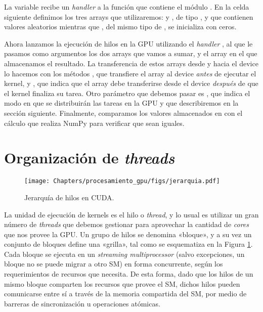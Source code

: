 La variable  recibe un \textit{handler} a la función que contiene el módulo . En la celda siguiente definimos los tres arrays que utilizaremos:  y , de tipo , y que contienen valores aleatorios mientras que , del mismo tipo de , se inicializa con ceros.


Ahora lanzamos la ejecución de hilos en la GPU utilizando el \textit{handler} , al que le pasamos como argumentos los dos arrays que vamos a sumar, y el array en el que almacenamos el resultado. La transferencia de estos arrays desde y hacia el device lo hacemos con los métodos , que transfiere el array al device \textit{antes} de ejecutar el kernel, y , que indica que el array debe transferirse desde el device \textit{después} de que el kernel finaliza su tarea. Otro parámetro que debemos pasar es , que indica el modo en que se distribuirán las tareas en la GPU  y que describiremos en la sección siguiente. Finalmente, comparamos los valores almacenados en  con el cálculo que realiza NumPy para verificar que sean iguales.



\section{Organización de \textit{threads}}

\begin{figure}
    \begin{center}
        \texttt{[image: Chapters/procesamiento\_gpu/figs/jerarquia.pdf]}
        \caption{Jerarquía de hilos en CUDA.}
        \label{fig:jerarquia}
    \end{center}
\end{figure}


La unidad de ejecución de kernels es el hilo o \textit{thread}, y lo usual es utilizar un gran número de \textit{threads} que debemos gestionar para aprovechar la cantidad de \textit{cores} que nos provee la GPU. Un grupo de hilos se denomina «bloque», y a su vez un conjunto de bloques define una «grilla», tal como se esquematiza en la Figura \ref{fig:jerarquia}. Cada bloque se ejecuta en un \textit{streaming multiprocessor} (salvo excepciones, un bloque no se puede migrar a otro SM) en forma concurrente, según los requerimientos de recursos que necesita. De esta forma, dado que los hilos de un mismo bloque comparten los recursos que provee el SM, dichos hilos pueden comunicarse entre sí a través de la memoria compartida del SM, por medio de barreras de sincronización u operaciones atómicas.

